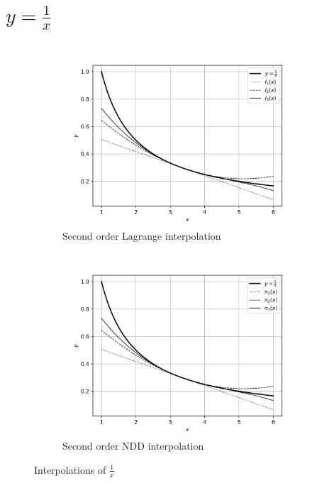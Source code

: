 \documentclass[12,a4paper]{article}
\begin{document}
    \section{$y = \frac{1}{x}$}
    \begin{figure}[h!]
        \centering
        \begin{subfigure}[t]{0.49\textwidth}
            \includegraphics[width=\textwidth]{plots/q4a.png}
            \caption{Second order Lagrange interpolation}
            \label{fig:q4a}
        \end{subfigure}
        \begin{subfigure}[t]{0.49\textwidth}
            \includegraphics[width=\textwidth]{plots/q4b.png}
            \caption{Second order NDD interpolation}
            \label{fig:q4b}
        \end{subfigure}
        \caption{Interpolations of $\frac{1}{x}$}
    \end{figure}
\end{document}
